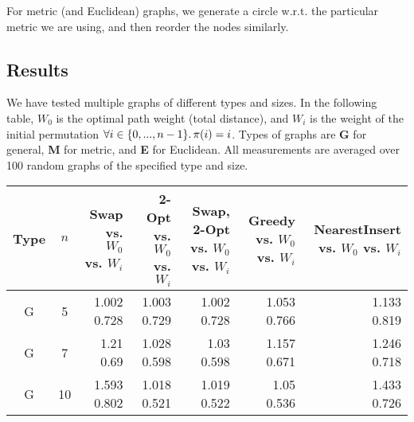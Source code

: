 \documentclass{article}
\newcommand{\bb}[1]{\textbf{#1}}
\begin{document}
For metric (and Euclidean) graphs, we generate a circle w.r.t.
the particular metric we are using, and then reorder the nodes similarly.

\subsection{Results}

We have tested multiple graphs of different types and sizes. In the following table,
$W_0$ is the optimal path weight (total distance), and $W_i$ is the weight of the initial
permutation $\forall i\in \{ 0,...,n-1 \} \ldotp \pi(i)=i$. Types of graphs are
\bb{G} for general, \bb{M} for metric, and \bb{E} for Euclidean. All measurements are
averaged over 100 random graphs of the specified type and size.

{\small
\begin{tabular}{|c c|r r r r r|}
  \hline Type & $n$ & \shortstack{ Swap \\ vs. $W_0$ \\ vs. $W_i$ } & \shortstack{ 2-Opt \\ vs. $W_0$ \\ vs. $W_i$ } & \shortstack{ Swap, 2-Opt \\ vs. $W_0$ \\ vs. $W_i$ } & \shortstack{ Greedy \\ vs. $W_0$ \\ vs. $W_i$ } & \shortstack{ NearestInsert \\ vs. $W_0$ \\ vs. $W_i$ } \\
  \hline\hline
  G & 5 & \shortstack{ 1.002 \\ 0.728 } & \shortstack{ 1.003 \\ 0.729 } & \shortstack{ 1.002 \\ 0.728 } & \shortstack{ 1.053 \\ 0.766 } & \shortstack{ 1.133 \\ 0.819 } \\ 
  \hline
  G & 7 & \shortstack{ 1.21 \\ 0.69 } & \shortstack{ 1.028 \\ 0.598 } & \shortstack{ 1.03 \\ 0.598 } & \shortstack{ 1.157 \\ 0.671 } & \shortstack{ 1.246 \\ 0.718 } \\ 
  \hline
  G & 10 & \shortstack{ 1.593 \\ 0.802 } & \shortstack{ 1.018 \\ 0.521 } & \shortstack{ 1.019 \\ 0.522 } & \shortstack{ 1.05 \\ 0.536 } & \shortstack{ 1.433 \\ 0.726 } \\ 

\end{tabular}}
\end{document}
